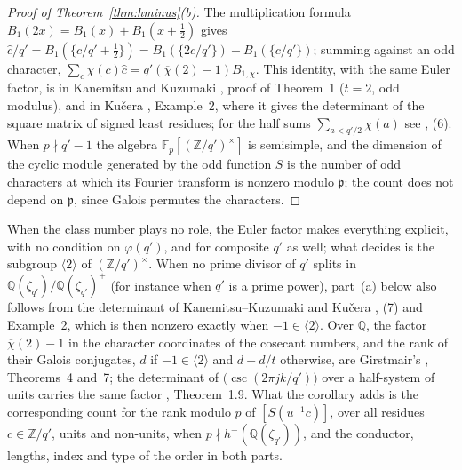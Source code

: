 \documentclass[11pt,a4paper]{article}
\theoremstyle{definition}
\newcommand{\ZZ}{\mathbb{Z}}
\newcommand{\QQ}{\mathbb{Q}}
\newcommand{\FF}{\mathbb{F}}
\begin{document}
\begin{proof}[Proof of Theorem~\ref{thm:hminus}(b)]
The multiplication formula $B_1(2x)=B_1(x)+B_1(x+\tfrac12)$ gives
$\hat c/q'=B_1(\{c/q'+\tfrac12\})=B_1(\{2c/q'\})-B_1(\{c/q'\})$; summing against an odd character,
$\sum_c\chi(c)\hat c=q'(\overline\chi(2)-1)B_{1,\chi}$. This identity, with the same Euler factor, is in Kanemitsu and
Kuzumaki \cite{KK01}, proof of Theorem~1 ($t=2$, odd modulus), and in Kučera \cite{Kuc01}, Example~2, where it gives the
determinant of the square matrix of signed least residues; for the half sums $\sum_{a<q'/2}\chi(a)$ see
\cite{SUZ95}, (6). When $p\nmid q'-1$ the algebra $\FF_p[(\ZZ/q')^\times]$ is semisimple, and the dimension of
the cyclic module generated by the odd function $S$ is the number of odd characters at which its Fourier
transform is nonzero modulo $\mathfrak p$; the count does not depend on $\mathfrak p$, since Galois permutes the
characters.
\end{proof}

\noindent When the class number plays no role, the Euler factor makes everything explicit, with no condition on
$\varphi(q')$, and for composite $q'$ as well; what decides is the subgroup $\langle2\rangle$ of $(\ZZ/q')^\times$. When no
prime divisor of $q'$ splits in $\QQ(\zeta_{q'})/\QQ(\zeta_{q'})^+$ (for instance when $q'$ is a prime power), part~(a)
below also follows from the determinant of Kanemitsu--Kuzumaki \cite{KK01} and Kučera \cite{Kuc01}, (7) and Example~2, which is
then nonzero exactly when $-1\in\langle2\rangle$. Over $\QQ$, the factor $\overline\chi(2)-1$ in the character
coordinates of the cosecant numbers, and the rank of their Galois conjugates, $d$ if $-1\in\langle2\rangle$ and $d-d/t$
otherwise, are Girstmair's \cite{Gir87}, Theorems~4 and~7; the determinant of $\bigl(\csc(2\pi jk/q')\bigr)$ over a half-system of units
carries the same factor \cite{GG25}, Theorem~1.9. What the corollary adds is the corresponding count for the rank
modulo $p$ of $[S(u^{-1}c)]$, over all residues $c\in\ZZ/q'$, units and non-units, when
$p\nmid h^-(\QQ(\zeta_{q'}))$, and the conductor, lengths, index and type of the order
in both parts.
\end{document}
